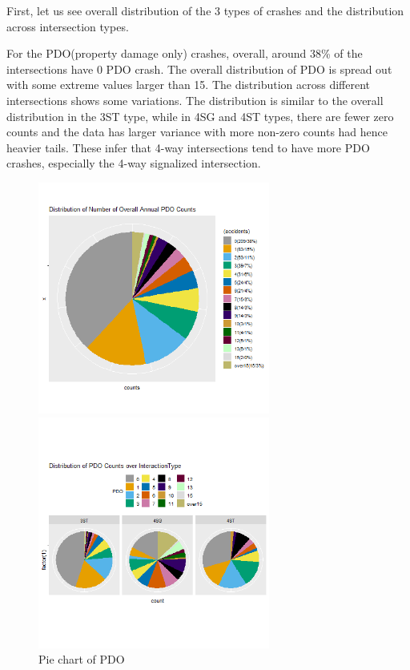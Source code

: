 \documentclass[11pt]{scrartcl} %
\begin{document}
First, let us see overall distribution of the 3 types of crashes and the distribution across intersection types.

For the PDO(property damage only) crashes, overall, around 38\% of the intersections have 0 PDO crash. The overall distribution of PDO is spread out with some extreme values larger than 15. The distribution across different intersections shows some variations. The distribution is similar to the overall distribution in the 3ST type, while in 4SG and 4ST types, there are fewer zero counts and the data has larger variance with more non-zero counts had hence heavier tails. These infer that 4-way intersections tend to have more PDO crashes, especially the 4-way signalized intersection.

\begin{figure}[H]
\begin{minipage}[t]{0.5\linewidth}
\centering
\includegraphics[width=3in]{image/p111.png}
\small
\end{minipage}
\begin{minipage}[t]{0.5\linewidth}
\centering
\includegraphics[width=3in]{image/p121_PDO.png}
\small
\end{minipage}
\caption{Pie chart of PDO}
\end{figure}
\end{document}
